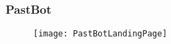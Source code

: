 \begin{frame}

  \frametitle{PastBot}

  \begin{figure}[H]
    \centering
    \texttt{[image: PastBotLandingPage]}
  \end{figure}

  
\end{frame}

